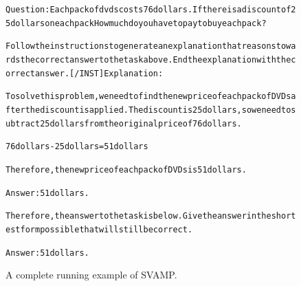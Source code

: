 \begin{figure}[t]
{{\begin{alltt}
Question: Each pack of dvds costs 76 dollars. If there is a discount of 25 dollars on each pack How much do you have to pay to buy each pack?

Follow the instructions to generate an explanation that reasons towards the correct answer to the task above. End the explanation with the correct answer. [/INST] Explanation: 

To solve this problem, we need to find the new price of each pack of DVDs after the discount is applied. The discount is 25 dollars, so we need to subtract 25 dollars from the original price of 76 dollars.

76 dollars - 25 dollars = 51 dollars

Therefore, the new price of each pack of DVDs is 51 dollars.

Answer: 51 dollars.

Therefore, the answer to the task is below. Give the answer in the shortest form possible that will still be correct.

Answer: 51 dollars.
\end{alltt}
}}
\caption{A complete running example of SVAMP.}
\label{fig:svamp_example}
\end{figure}
